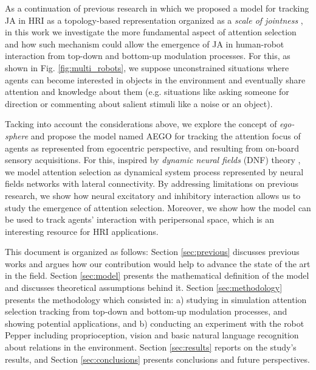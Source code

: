 \documentclass[letterpaper, 10 pt, conference]{ieeeconf}  %
\begin{document}
	As a continuation of previous research in which we proposed a model for tracking JA in HRI as a topology-based representation organized as a \textit{scale of jointness} \cite{chame2023top}, in this work we investigate the more fundamental aspect of attention selection and how such mechanism could allow the emergence of JA in human-robot interaction from top-down and bottom-up modulation processes. For this, as shown in Fig. \ref{fig:multi_robots}, we suppose unconstrained situations where agents can become interested in objects in the environment and eventually share attention and knowledge about them (e.g. situations like asking someone for direction or commenting about salient stimuli like a noise or an object). 
	
	Tacking into account the considerations above, we explore the concept of \textit{ego-sphere} \cite{albus1991} and propose the model named AEGO for tracking the attention focus of agents as represented from egocentric perspective, and resulting from on-board sensory acquisitions. For this, inspired by \textit{dynamic neural fields} (DNF) theory \cite{amari1977}, we model attention selection as dynamical system process represented by neural fields networks with lateral connectivity. By addressing limitations on previous research, we show how neural excitatory and inhibitory interaction allows us to study the emergence of attention selection. Moreover, we show how the model can be used to track agents' interaction with peripersonal space, which is an interesting resource for HRI applications. 
	
	  	  
	This document is organized as follows: Section \ref{sec:previous} discusses previous works and argues how our contribution would help to advance the state of the art in the field. Section \ref{sec:model} presents the mathematical definition of the model and discusses theoretical assumptions behind it. Section \ref{sec:methodology} presents the methodology which consisted in: a) studying in simulation attention selection tracking from top-down and bottom-up modulation processes, and showing potential applications, and b) conducting an experiment with the robot Pepper including proprioception, vision and basic natural language recognition about relations in the environment. Section \ref{sec:results} reports on the study’s results, and Section \ref{sec:conclusions} presents conclusions and future perspectives.
	  
\end{document}
